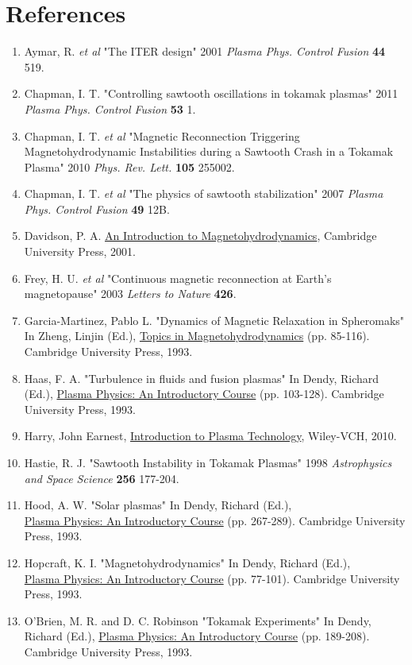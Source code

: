 \documentclass{article}
\begin{document}
\section{References}
\begin{enumerate}
\item Aymar, R. \textit{et al} "The ITER design" 2001 \textit{Plasma Phys. Control Fusion} \textbf{44} 519.
\item Chapman, I. T. "Controlling sawtooth oscillations in tokamak plasmas" 2011 \textit{Plasma Phys. Control Fusion} \textbf{53} 1.
\item Chapman, I. T. \textit{et al} "Magnetic Reconnection Triggering Magnetohydrodynamic Instabilities during a Sawtooth Crash in a Tokamak Plasma" 2010 \textit{Phys. Rev. Lett.} \textbf{105} 255002.
\item Chapman, I. T. \textit{et al} "The physics of sawtooth stabilization" 2007 \textit{Plasma Phys. Control Fusion} \textbf{49} 12B.
\item Davidson, P. A. \underline{An Introduction to Magnetohydrodynamics}, Cambridge University Press, 2001.
\item Frey, H. U. \textit{et al} "Continuous magnetic reconnection at Earth's magnetopause" 2003 \textit{Letters to Nature} \textbf{426}.
\item Garcia-Martinez, Pablo L. "Dynamics of Magnetic Relaxation in Spheromaks" In Zheng, Linjin (Ed.), \underline{Topics in Magnetohydrodynamics} (pp. 85-116). Cambridge University Press, 1993.
\item Haas, F. A. "Turbulence in fluids and fusion plasmas" In Dendy, Richard (Ed.), \underline{Plasma Physics: An Introductory Course} (pp. 103-128). Cambridge University Press, 1993.
\item Harry, John Earnest,  \underline{Introduction to Plasma Technology}, Wiley-VCH, 2010.
\item Hastie, R. J. "Sawtooth Instability in Tokamak Plasmas" 1998 \textit{Astrophysics and Space Science} \textbf{256} 177-204.
\item Hood, A. W. "Solar plasmas" In Dendy, Richard (Ed.),\\ \underline{Plasma Physics: An Introductory Course} (pp. 267-289). Cambridge University Press, 1993.
\item Hopcraft, K. I. "Magnetohydrodynamics" In Dendy, Richard (Ed.),\\ \underline{Plasma Physics: An Introductory Course} (pp. 77-101). Cambridge University Press, 1993.
\item O'Brien, M. R. and D. C. Robinson "Tokamak Experiments" In Dendy, Richard (Ed.), \underline{Plasma Physics: An Introductory Course} (pp. 189-208). Cambridge University Press, 1993.

\end{enumerate}
\end{document}
